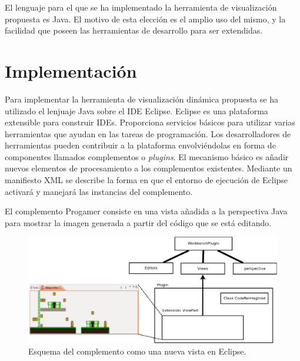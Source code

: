 \documentclass{llncs}
\begin{document}
El lenguaje para el que se ha implementado la herramienta de visualización propuesta es Java. El motivo de esta elección es el amplio uso del mismo, y la facilidad que poseen las herramientas de desarrollo para ser extendidas.


\section{Implementación}
\label{sec:details}
Para implementar la herramienta de visualización dinámica propuesta se ha utilizado el lenjuaje Java sobre el IDE Eclipse. Eclipse es una plataforma extensible para construir IDEs. Proporciona servicios básicos para utilizar varias herramientas que ayudan en las tareas de programación. Los desarrolladores de herramientas pueden contribuir a la plataforma envolviéndolas en forma de componentes llamados complementos o \emph{plugins}. El mecanismo básico es añadir nuevos elementos de procesamiento a los complementos existentes. Mediante un manifiesto XML se describe la forma en que el entorno de ejecución de Eclipse activará y manejará las instancias del complemento. 

El complemento Progamer consiste en una vista añadida a la perspectiva Java para mostrar la imagen generada a partir del código que se está editando. 

\begin{figure}[ht]
\begin{center}
\includegraphics[scale=0.35]{images/crplugin.eps}
\caption{Esquema del complemento como una nueva vista en Eclipse.
\label{fig:crplugin}}
\end{center}
\end{figure}
\end{document}

